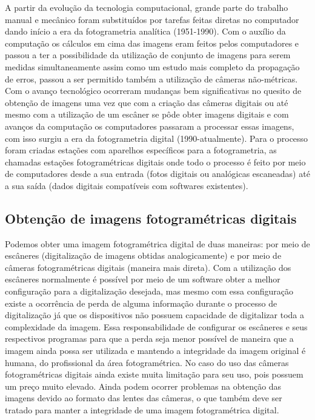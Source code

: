 A partir da evolução da tecnologia computacional, grande parte do trabalho manual e mecânico foram substituídos por tarefas feitas diretas no computador dando início a era da fotogrametria analítica (1951-1990). Com o auxílio da computação os cálculos em cima das imagens eram feitos pelos computadores e passou a ter a possibilidade da utilização de conjunto de imagens para serem medidas simultaneamente assim como um estudo mais completo da propagação de erros, passou a ser permitido também a utilização de câmeras não-métricas.
Com o avanço tecnológico ocorreram mudanças bem significativas no quesito de obtenção de imagens uma vez que com a criação das câmeras digitais ou até mesmo com a utilização de um escâner se pôde obter imagens digitais e com avanços da computação os computadores passaram a processar essas imagens, com isso surgiu a era da fotogrametria digital (1990-atualmente). Para o processo foram criadas estações com aparelhos específicos para a fotogrametria, as chamadas estações fotogramétricas digitais onde todo o processo é feito por meio de computadores desde a sua entrada (fotos digitais ou analógicas escaneadas) até a sua saída (dados digitais compatíveis com softwares existentes).

\subsection{Obtenção de imagens fotogramétricas digitais}
Podemos obter uma imagem fotogramétrica digital de duas maneiras: por meio de escâneres (digitalização de imagens obtidas analogicamente) e por meio de câmeras fotogramétricas digitais (maneira mais direta). Com a utilização dos escâneres normalmente é possível por meio de um software obter a melhor configuração para a digitalização desejada, mas mesmo com essa configuração existe a ocorrência de perda de alguma informação durante o processo de digitalização já que os dispositivos não possuem capacidade de digitalizar toda a complexidade da imagem. Essa responsabilidade de configurar os escâneres e seus respectivos programas para que a perda seja menor possível de maneira que a imagem ainda possa ser utilizada e mantendo a integridade da imagem original é humana, do profissional da área fotogramétrica. No caso do uso das câmeras fotogramétricas digitais ainda existe muita limitação para seu uso, pois possuem um preço muito elevado. Ainda podem ocorrer problemas na obtenção das imagens devido ao formato das lentes das câmeras, o que também deve ser tratado para manter a integridade de uma imagem fotogramétrica digital.

